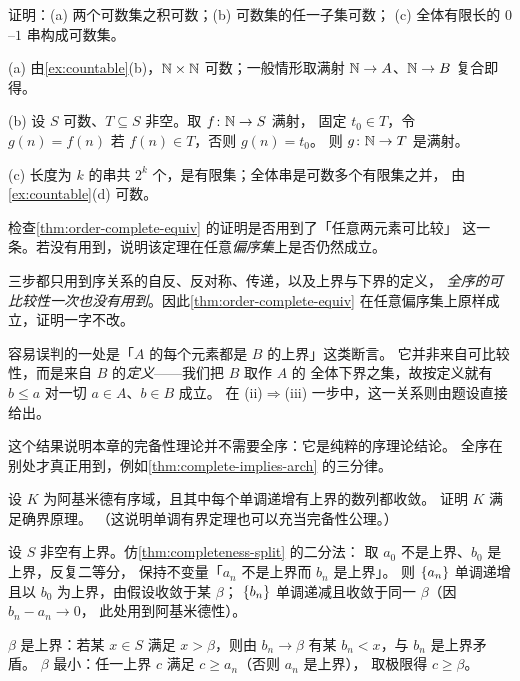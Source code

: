 \begin{exercise}[例行]
  \label{exr:countable-examples}
  证明：(a) 两个可数集之积可数；(b) 可数集的任一子集可数；
  (c) 全体有限长的 \(0\)--\(1\) 串构成可数集。
  \begin{solution}
    (a) 由\cref{ex:countable}(b)，\(\mathbb{N} \times \mathbb{N}\) 可数；一般情形取满射
    \(\mathbb{N} \to A\)、\(\mathbb{N} \to B\) 复合即得。

    (b) 设 \(S\) 可数、\(T \subseteq S\) 非空。取 \(f \colon \mathbb{N} \to S\) 满射，
    固定 \(t_{0} \in T\)，令 \(g(n) = f(n)\) 若 \(f(n) \in T\)，否则 \(g(n) = t_{0}\)。
    则 \(g \colon \mathbb{N} \to T\) 是满射。

    (c) 长度为 \(k\) 的串共 \(2^{k}\) 个，是有限集；全体串是可数多个有限集之并，
    由\cref{ex:countable}(d) 可数。
  \end{solution}
\end{exercise}

\begin{exercise}[结构]
  \label{exr:cut-vs-sup}
  检查\cref{thm:order-complete-equiv} 的证明是否用到了「任意两元素可比较」
  这一条。若没有用到，说明该定理在任意\emph{偏序集}上是否仍然成立。
  \begin{solution}
    三步都只用到序关系的自反、反对称、传递，以及上界与下界的定义，
    \emph{全序的可比较性一次也没有用到}。因此\cref{thm:order-complete-equiv}
    在任意偏序集上原样成立，证明一字不改。

    容易误判的一处是「\(A\) 的每个元素都是 \(B\) 的上界」这类断言。
    它并非来自可比较性，而是来自 \(B\) 的\emph{定义}——我们把 \(B\) 取作 \(A\) 的
    全体下界之集，故按定义就有 \(b \le a\) 对一切 \(a \in A\)、\(b \in B\) 成立。
    在 (ii)\(\Rightarrow\)(iii) 一步中，这一关系则由题设直接给出。

    这个结果说明本章的完备性理论并不需要全序：它是纯粹的序理论结论。
    全序在别处才真正用到，例如\cref{thm:complete-implies-arch} 的三分律。
  \end{solution}
\end{exercise}

\begin{exercise}[结构]
  \label{exr:which-axiom}
  设 \(K\) 为阿基米德有序域，且其中每个单调递增有上界的数列都收敛。
  证明 \(K\) 满足确界原理。
  （这说明单调有界定理也可以充当完备性公理。）
  \begin{solution}
    设 \(S\) 非空有上界。仿\cref{thm:completeness-split} 的二分法：
    取 \(a_{0}\) 不是上界、\(b_{0}\) 是上界，反复二等分，
    保持不变量「\(a_{n}\) 不是上界而 \(b_{n}\) 是上界」。
    则 \(\{a_{n}\}\) 单调递增且以 \(b_{0}\) 为上界，由假设收敛于某 \(\beta\)；
    \(\{b_{n}\}\) 单调递减且收敛于同一 \(\beta\)（因 \(b_{n}-a_{n} \to 0\)，
    此处用到阿基米德性）。

    \(\beta\) 是上界：若某 \(x \in S\) 满足 \(x > \beta\)，则由 \(b_{n} \to \beta\)
    有某 \(b_{n} < x\)，与 \(b_{n}\) 是上界矛盾。
    \(\beta\) 最小：任一上界 \(c\) 满足 \(c \ge a_{n}\)（否则 \(a_{n}\) 是上界），
    取极限得 \(c \ge \beta\)。
  \end{solution}
\end{exercise}

